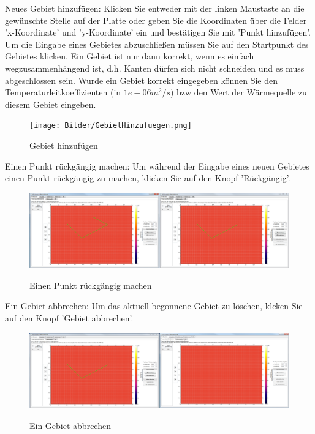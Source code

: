 \noindent
Neues Gebiet hinzufügen:
Klicken Sie entweder mit der linken Maustaste an die gewünschte Stelle auf der Platte oder geben Sie die Koordinaten über die Felder 'x-Koordinate' und 'y-Koordinate' ein und bestätigen Sie mit 'Punkt hinzufügen'. Um die Eingabe eines Gebietes abzuschließen müssen Sie auf den Startpunkt des Gebietes klicken. Ein Gebiet ist nur dann korrekt, wenn es einfach wegzusammenhängend ist, d.h. Kanten dürfen sich nicht schneiden und es muss abgeschlossen sein. Wurde ein Gebiet korrekt eingegeben können Sie den Temperaturleitkoeffizienten (in $1e-06 m^2/s$) bzw den Wert der Wärmequelle zu diesem Gebiet eingeben.
\begin{figure}[H]
\centering
\texttt{[image: Bilder/GebietHinzufuegen.png]}\\
\caption{Gebiet hinzufügen}
\label{Ein neues Gebiet hinzufügen}
\end{figure}

\newpage
\noindent
Einen Punkt rückgängig machen:
Um während der Eingabe eines neuen Gebietes einen Punkt rückgängig zu machen, klicken Sie auf den Knopf 'Rückgängig'.
\begin{figure}[H]
\centering
\includegraphics[scale=.25]{Bilder/PunktRueckgaengig.png}\\
\caption{Einen Punkt rückgängig machen}
\label{PunktRueckgaengig}
\end{figure}

\noindent
Ein Gebiet abbrechen: Um das aktuell begonnene Gebiet zu löschen, klcken Sie auf den Knopf 'Gebiet abbrechen'.
\begin{figure}[H]
\centering
\includegraphics[scale=.25]{Bilder/GebietAbbrechen.png}\\
\caption{Ein Gebiet abbrechen}
\label{GebietAbbrechen}
\end{figure}

